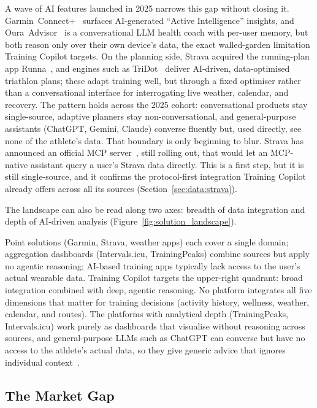 A wave of AI features launched in 2025 narrows this gap without closing it. Garmin~Connect+~\citep{garmin_connectplus_2025} surfaces AI-generated ``Active Intelligence'' insights, and Oura~Advisor~\citep{oura_advisor_2025} is a conversational LLM health coach with per-user memory, but both reason only over their own device's data, the exact walled-garden limitation Training Copilot targets. On the planning side, Strava acquired the running-plan app Runna~\citep{runna_2025}, and engines such as TriDot~\citep{tridot_2025} deliver AI-driven, data-optimised triathlon plans; these adapt training well, but through a fixed optimiser rather than a conversational interface for interrogating live weather, calendar, and recovery. The pattern holds across the 2025 cohort: conversational products stay single-source, adaptive planners stay non-conversational, and general-purpose assistants (ChatGPT, Gemini, Claude) converse fluently but, used directly, see none of the athlete's data. That boundary is only beginning to blur. Strava has announced an official MCP server~\citep{strava_api_update_2026}, still rolling out, that would let an MCP-native assistant query a user's Strava data directly. This is a first step, but it is still single-source, and it confirms the protocol-first integration Training Copilot already offers across all its sources (Section~\ref{sec:data:strava}).

The landscape can also be read along two axes: breadth of data integration and depth of AI-driven analysis (Figure~\ref{fig:solution_landscape}).



Point solutions (Garmin, Strava, weather apps) each cover a single domain; aggregation dashboards (Intervals.icu, TrainingPeaks) combine sources but apply no agentic reasoning; AI-based training apps typically lack access to the user's actual wearable data. Training Copilot targets the upper-right quadrant: broad integration combined with deep, agentic reasoning. No platform integrates all five dimensions that matter for training decisions (activity history, wellness, weather, calendar, and routes). The platforms with analytical depth (TrainingPeaks, Intervals.icu) work purely as dashboards that visualise without reasoning across sources, and general-purpose LLMs such as ChatGPT can converse but have no access to the athlete's actual data, so they give generic advice that ignores individual context~\citep{puce_harnessing_2025}.

\subsection{The Market Gap}\label{sec:market:gap}

